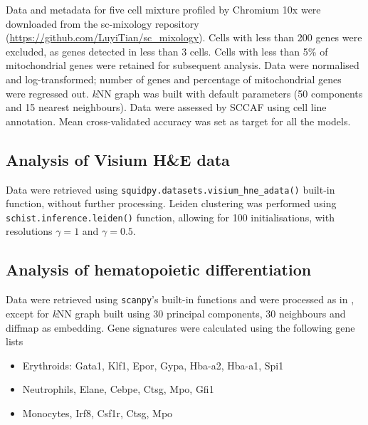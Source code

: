 \documentclass[10pt]{article}
\begin{document}
Data and metadata for five cell mixture profiled by Chromium 10x were downloaded from the sc-mixology repository (\href{https://github.com/LuyiTian/sc_mixology}{https:/\slash github.com\slash LuyiTian\slash sc\_mixology}). Cells with less than 200 genes were excluded, as genes detected in less than 3 cells. Cells with less than 5\% of mitochondrial genes were retained for subsequent analysis. Data were normalised and log-transformed; number of genes and percentage of mitochondrial genes were regressed out. \emph{k}NN graph was built with default parameters (50 components and 15 nearest neighbours). Data were assessed by SCCAF using cell line annotation. Mean cross-validated accuracy was set as target for all the models.

\subsection*{Analysis of Visium H\&E data}
Data were retrieved using \texttt{squidpy.datasets.visium\_hne\_adata()} built-in function, without further processing. Leiden clustering was performed using \texttt{schist.inference.leiden()} function, allowing for 100 initialisations, with resolutions $\gamma = 1$ and $\gamma = 0.5$. 

\subsection*{Analysis of hematopoietic differentiation}

Data were retrieved using \texttt{scanpy}'s built-in functions and were processed as in \cite{wolf_2019}, except for \emph{k}NN graph built using 30 principal components, 30 neighbours and diffmap as embedding. Gene signatures were calculated using the following gene lists

\begin{itemize}
\item Erythroids: Gata1, Klf1, Epor, Gypa, Hba-a2, Hba-a1, Spi1
\item Neutrophils, Elane, Cebpe, Ctsg, Mpo, Gfi1
\item Monocytes, Irf8, Csf1r, Ctsg, Mpo
\end{itemize}
\end{document}
